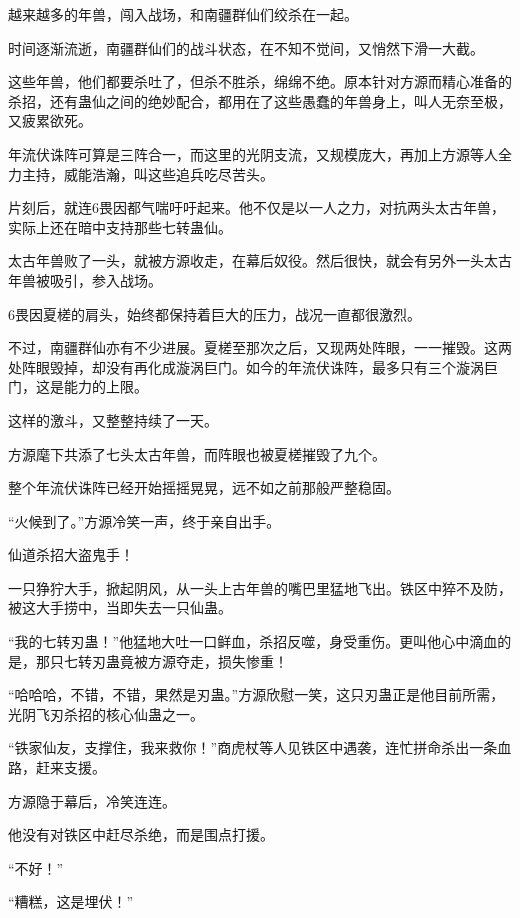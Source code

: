 
\begin{this_body}

越来越多的年兽，闯入战场，和南疆群仙们绞杀在一起。

时间逐渐流逝，南疆群仙们的战斗状态，在不知不觉间，又悄然下滑一大截。

这些年兽，他们都要杀吐了，但杀不胜杀，绵绵不绝。原本针对方源而精心准备的杀招，还有蛊仙之间的绝妙配合，都用在了这些愚蠢的年兽身上，叫人无奈至极，又疲累欲死。

年流伏诛阵可算是三阵合一，而这里的光阴支流，又规模庞大，再加上方源等人全力主持，威能浩瀚，叫这些追兵吃尽苦头。

片刻后，就连6畏因都气喘吁吁起来。他不仅是以一人之力，对抗两头太古年兽，实际上还在暗中支持那些七转蛊仙。

太古年兽败了一头，就被方源收走，在幕后奴役。然后很快，就会有另外一头太古年兽被吸引，参入战场。

6畏因夏槎的肩头，始终都保持着巨大的压力，战况一直都很激烈。

不过，南疆群仙亦有不少进展。夏槎至那次之后，又现两处阵眼，一一摧毁。这两处阵眼毁掉，却没有再化成漩涡巨门。如今的年流伏诛阵，最多只有三个漩涡巨门，这是能力的上限。

这样的激斗，又整整持续了一天。

方源麾下共添了七头太古年兽，而阵眼也被夏槎摧毁了九个。

整个年流伏诛阵已经开始摇摇晃晃，远不如之前那般严整稳固。

“火候到了。”方源冷笑一声，终于亲自出手。

仙道杀招大盗鬼手！

一只狰狞大手，掀起阴风，从一头上古年兽的嘴巴里猛地飞出。铁区中猝不及防，被这大手捞中，当即失去一只仙蛊。

“我的七转刃蛊！”他猛地大吐一口鲜血，杀招反噬，身受重伤。更叫他心中滴血的是，那只七转刃蛊竟被方源夺走，损失惨重！

“哈哈哈，不错，不错，果然是刃蛊。”方源欣慰一笑，这只刃蛊正是他目前所需，光阴飞刃杀招的核心仙蛊之一。

“铁家仙友，支撑住，我来救你！”商虎杖等人见铁区中遇袭，连忙拼命杀出一条血路，赶来支援。

方源隐于幕后，冷笑连连。

他没有对铁区中赶尽杀绝，而是围点打援。

“不好！”

“糟糕，这是埋伏！”


\end{this_body}
